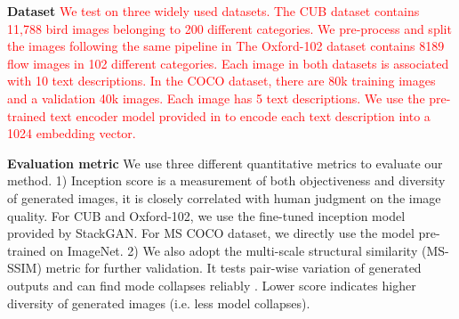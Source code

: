 \documentclass[10pt,twocolumn,letterpaper]{article}
\begin{document}
\textbf{Dataset} 
\textcolor{red}{We test on three widely used datasets. The CUB dataset \cite{welinder2010caltech} contains 11,788 bird images belonging to 200 different categories. We pre-process and split the images following the same pipeline in \cite{reed2016generative,han2017stackgan}
The Oxford-102 dataset \cite{Nilsback08} contains 8189 flow images in 102 different categories. 
Each image in both datasets is associated with 10 text descriptions. \textcolor{red}{In the COCO dataset, \cite{lin2014microsoft} there are 80k training images and a validation 40k images.  Each image has 5 text descriptions. }
We use the pre-trained text encoder model provided in \cite{reed2016generative} to encode each text description into a 1024 embedding vector.
}

\textbf{Evaluation metric}
We use three different quantitative metrics to evaluate our method.
1) Inception score \cite{improvedGAN} is a measurement of both objectiveness and diversity of generated images, it is closely correlated with human judgment on the image quality. For CUB and Oxford-102, we use the fine-tuned inception model provided by StackGAN. For MS COCO dataset, we directly use the model pre-trained on ImageNet.
2) We also adopt the multi-scale structural similarity (MS-SSIM) metric \cite{improvedGAN} for further validation. It tests pair-wise variation of generated outputs and can find mode collapses reliably \cite{odena2016conditional}. Lower score indicates higher diversity of generated images (i.e. less model collapses). 
\end{document}
